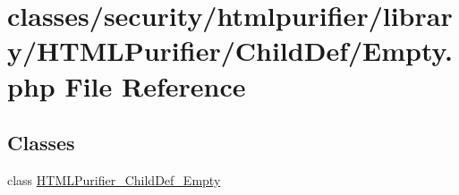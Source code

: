 \hypertarget{ChildDef_2Empty_8php}{\section{classes/security/htmlpurifier/library/\+H\+T\+M\+L\+Purifier/\+Child\+Def/\+Empty.php File Reference}
\label{ChildDef_2Empty_8php}
}
\subsection*{Classes}
\begin{DoxyCompactItemize}
\item 
class \hyperlink{classHTMLPurifier__ChildDef__Empty}{H\+T\+M\+L\+Purifier\+\_\+\+Child\+Def\+\_\+\+Empty}
\end{DoxyCompactItemize}
